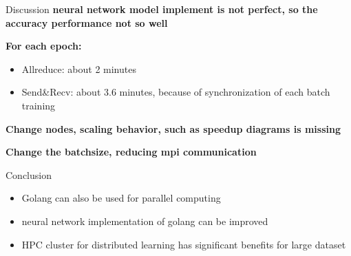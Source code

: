 \documentclass[presentation]{beamer}
\begin{document}
\begin{frame}[label={sec:org82bca34}]{Discussion}
\textbf{neural network model implement is not perfect, so the accuracy performance not so well}

\textbf{For each epoch:}
\begin{itemize}
\item Allreduce: about 2 minutes
\item Send\&Recv: about 3.6 minutes, because of synchronization of each batch training
\end{itemize}


\textbf{Change nodes, scaling behavior, such as speedup diagrams is missing}

\textbf{Change the batchsize, reducing mpi communication}
\end{frame}

\begin{frame}[label={sec:org255c599}]{Conclusion}
\begin{itemize}
\item Golang can also be used for parallel computing
\item neural network implementation of golang can be improved
\item HPC cluster for distributed learning has significant benefits for large dataset
\end{itemize}
\end{frame}
\end{document}
